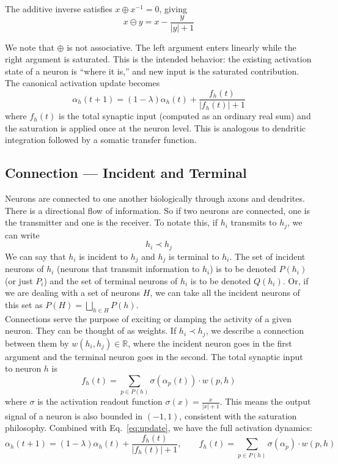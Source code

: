 \documentclass[11pt]{article}
\begin{document}
The additive inverse satisfies $x \oplus x^{-1} = 0$, giving
\begin{equation}
    x \ominus y = x - \frac{y}{|y|+1}
\end{equation}

We note that $\oplus$ is not associative. The left argument enters linearly while the right argument is saturated. This is the intended behavior: the existing activation state of a neuron is ``where it is,'' and new input is the saturated contribution. The canonical activation update becomes
\begin{equation}\label{eq:update}
    \alpha_h(t+1) = (1-\lambda)\alpha_h(t) + \frac{f_h(t)}{|f_h(t)|+1}
\end{equation}
where $f_h(t)$ is the total synaptic input (computed as an ordinary real sum) and the saturation is applied once at the neuron level. This is analogous to dendritic integration followed by a somatic transfer function.

\subsection{Connection --- Incident and Terminal}
Neurons are connected to one another biologically through axons and dendrites. There is a directional flow of information. So if two neurons are connected, one is the transmitter and one is the receiver. To notate this, if $h_i$ transmits to $h_j$, we can write
\begin{equation}
    h_i \prec h_j
\end{equation}
We can say that $h_i$ is incident to $h_j$ and $h_j$ is terminal to $h_i$. The set of incident neurons of $h_i$ (neurons that transmit information to $h_i$) is to be denoted $P(h_i)$ (or just $P_i$) and the set of terminal neurons of $h_i$ is to be denoted $Q(h_i)$. Or, if we are dealing with a set of neurons $H$, we can take all the incident neurons of this set as $P(H) = \bigsqcup_{h \in H} P(h)$.\\

Connections serve the purpose of exciting or damping the activity of a given neuron. They can be thought of as weights. If $h_i \prec h_j$, we describe a connection between them by $w(h_i,h_j) \in \mathbb{R}$, where the incident neuron goes in the first argument and the terminal neuron goes in the second. The total synaptic input to neuron $h$ is
\begin{equation}
    f_h(t) = \sum_{p \in P(h)} \sigma(\alpha_p(t)) \cdot w(p, h)
\end{equation}
where $\sigma$ is the activation readout function $\sigma(x) = \frac{x}{|x|+1}$. This means the output signal of a neuron is also bounded in $(-1,1)$, consistent with the saturation philosophy. Combined with Eq.~\eqref{eq:update}, we have the full activation dynamics:
\begin{equation}\label{eq:full_dynamics}
    \alpha_h(t+1) = (1-\lambda)\alpha_h(t) + \frac{f_h(t)}{|f_h(t)|+1}, \qquad f_h(t) = \sum_{p \in P(h)} \sigma(\alpha_p) \cdot w(p,h)
\end{equation}
\end{document}
